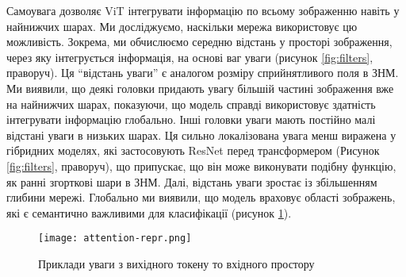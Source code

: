 Самоувага дозволяє ViT інтегрувати інформацію по всьому
зображенню навіть у найнижчих шарах. Ми досліджуємо, наскільки мережа
використовує цю можливість. Зокрема, ми обчислюємо середню
відстань у просторі зображення, через яку інтегрується інформація,
на основі ваг уваги (рисунок \ref{fig:filters}, праворуч).
Ця ``відстань уваги'' є аналогом розміру сприйнятливого поля в ЗНМ.
Ми виявили, що деякі головки придають увагу більшій частині зображення
вже на найнижчих шарах, показуючи, що модель справді
використовує здатність інтегрувати інформацію глобально.
Інші головки уваги мають постійно малі відстані уваги в низьких шарах.
Ця сильно локалізована увага менш виражена у гібридних моделях,
які застосовують ResNet перед трансформером
(Рисунок \ref{fig:filters}, праворуч), що припускає, що він може
виконувати подібну функцію, як ранні згорткові шари в ЗНМ.
Далі, відстань уваги зростає із збільшенням глибини мережі.
Глобально ми виявили, що модель враховує області зображень,
які є семантично важливими для класифікації
(рисунок \ref{fig:attention-repr}).

\begin{figure}[H]
    \centering
    \texttt{[image: attention-repr.png]}
    \caption{Приклади уваги з вихідного токену то вхідного простору}
    \label{fig:attention-repr}
\end{figure}
